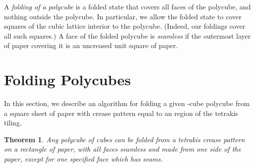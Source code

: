 \documentclass[11pt]{article}
\newtheorem{theorem}{Theorem}
\newcommand{\theolab}[1]{\label{theorem:#1}}
\begin{document}
A \emph{folding of a polycube} is a folded state that covers all faces
of the polycube, and nothing outside the polycube.  In particular, we
allow the folded state to cover squares of the cubic lattice
interior to the polycube.  (Indeed, our foldings cover all such squares.)
A face of the folded polycube is \emph{seamless} if the outermost layer of
paper covering it is an uncreased unit square of paper.










\section{Folding Polycubes}

In this section, we describe an algorithm for folding a given -cube
polycube from a square sheet of paper with crease pattern equal
to an  region of the tetrakis tiling.



\begin{theorem} \theolab{rectangle seam}
  Any polycube of  cubes can be folded from a tetrakis crease pattern
  on a  rectangle of paper,
  with all faces seamless and made from one side of the paper,
  except for one specified face which has seams.
\end{theorem}
\end{document}
